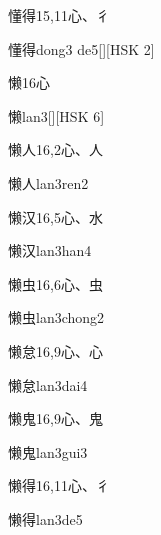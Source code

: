 \begin{Entry}{懂得}{15,11}{⼼、⼻}
  \begin{Phonetics}{懂得}{dong3 de5}[][HSK 2]
  \end{Phonetics}
\end{Entry}

\begin{Entry}{懒}{16}{⼼}
  \begin{Phonetics}{懒}{lan3}[][HSK 6]
  \end{Phonetics}
\end{Entry}

\begin{Entry}{懒人}{16,2}{⼼、⼈}
  \begin{Phonetics}{懒人}{lan3ren2}
  \end{Phonetics}
\end{Entry}

\begin{Entry}{懒汉}{16,5}{⼼、⽔}
  \begin{Phonetics}{懒汉}{lan3han4}
  \end{Phonetics}
\end{Entry}

\begin{Entry}{懒虫}{16,6}{⼼、⾍}
  \begin{Phonetics}{懒虫}{lan3chong2}
  \end{Phonetics}
\end{Entry}

\begin{Entry}{懒怠}{16,9}{⼼、⼼}
  \begin{Phonetics}{懒怠}{lan3dai4}
  \end{Phonetics}
\end{Entry}

\begin{Entry}{懒鬼}{16,9}{⼼、⿁}
  \begin{Phonetics}{懒鬼}{lan3gui3}
  \end{Phonetics}
\end{Entry}

\begin{Entry}{懒得}{16,11}{⼼、⼻}
  \begin{Phonetics}{懒得}{lan3de5}
  \end{Phonetics}
\end{Entry}

